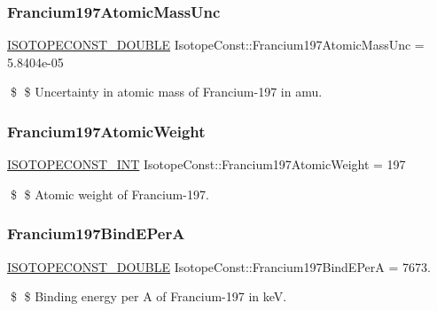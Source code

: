 \subsubsection{\texorpdfstring{Francium197\+Atomic\+Mass\+Unc}{Francium197AtomicMassUnc}}
{\footnotesize\ttfamily \mbox{\hyperlink{group___isotope_const-_macros_ga8f45a7272ce02c0b4c65c44636ed719a}{I\+S\+O\+T\+O\+P\+E\+C\+O\+N\+S\+T\+\_\+\+D\+O\+U\+B\+LE}} Isotope\+Const\+::\+Francium197\+Atomic\+Mass\+Unc = 5.\+8404e-\/05}

\$ \$ Uncertainty in atomic mass of Francium-\/197 in amu. \mbox{\label{group___isotope_const-_francium-_fr197_ga9fc9ffa461821a41f2bb06caf10f906d}} 
\subsubsection{\texorpdfstring{Francium197\+Atomic\+Weight}{Francium197AtomicWeight}}
{\footnotesize\ttfamily \mbox{\hyperlink{group___isotope_const-_macros_ga5f18360b3e99483a35c32d789e62621c}{I\+S\+O\+T\+O\+P\+E\+C\+O\+N\+S\+T\+\_\+\+I\+NT}} Isotope\+Const\+::\+Francium197\+Atomic\+Weight = 197}

\$ \$ Atomic weight of Francium-\/197. \mbox{\label{group___isotope_const-_francium-_fr197_ga7eb23b5382a4f88f46aa47fd8f25fc59}} 
\subsubsection{\texorpdfstring{Francium197\+Bind\+E\+PerA}{Francium197BindEPerA}}
{\footnotesize\ttfamily \mbox{\hyperlink{group___isotope_const-_macros_ga8f45a7272ce02c0b4c65c44636ed719a}{I\+S\+O\+T\+O\+P\+E\+C\+O\+N\+S\+T\+\_\+\+D\+O\+U\+B\+LE}} Isotope\+Const\+::\+Francium197\+Bind\+E\+PerA = 7673.}

\$ \$ Binding energy per A of Francium-\/197 in keV. \mbox{\label{group___isotope_const-_francium-_fr197_ga82d4b4fcf6ceb13c59879f37750beb53}} 
